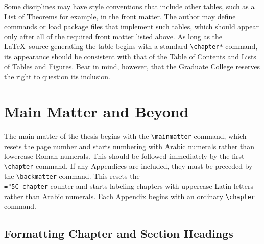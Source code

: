 \documentclass[11pt]{article}
\newcommand\code[1]{{\normalfont\texttt{\let\dv\textsl\chardef\\="5C #1}}}
\begin{document}
Some disciplines may have style conventions that include other tables, such as a List of Theorems for example, in the front matter.  The author may define commands or load package files that implement such tables, which should appear only after all of the required front matter listed above.  As long as the \LaTeX\ source generating the table begins with a standard \verb=\chapter*= command, its appearance should be consistent with that of the Table of Contents and Lists of Tables and Figures.  Bear in mind, however, that the Graduate College reserves the right to question its inclusion.



\section{Main Matter and Beyond}\label{main}

The main matter of the thesis begins with the \verb=\mainmatter= command, which resets the page number and starts numbering with Arabic numerals rather than lowercase Roman numerals.  This should be followed immediately by the first \verb=\chapter= command.  If any Appendices are included, they must be preceded by the \verb=\backmatter= command.  This resets the \code{chapter} counter and starts labeling chapters with uppercase Latin letters rather than Arabic numerals.  Each Appendix begins with an ordinary \verb=\chapter= command.


\subsection{Formatting Chapter and Section Headings}\label{S:headings}
\end{document}
